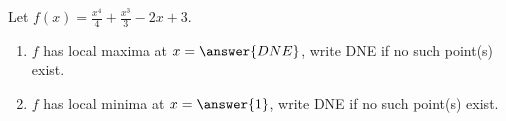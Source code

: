 \documentclass{ximera}
\author{Gregory Hartman \and Matthew Carr}
\begin{document}
\begin{exercise}






Let $f(x)=\frac{x^4}{4}+\frac{x^3}{3}-2x+3$.
\begin{enumerate}
\item		$f$ has local maxima at $x=\answer{DNE}$, write DNE if no such point(s) exist.
\item		$f$ has local minima at $x=\answer{1}$, write DNE if no such point(s) exist.
\end{enumerate}

\end{exercise}
\end{document}
